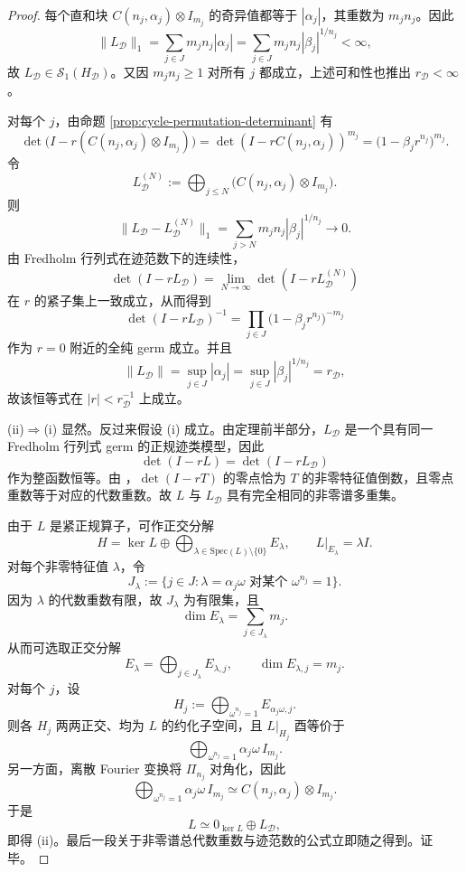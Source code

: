\begin{proof}
每个直和块 \(C(n_j,\alpha_j)\otimes I_{m_j}\) 的奇异值都等于 \(|\alpha_j|\)，其重数为 \(m_jn_j\)。因此
\[
\|L_{\mathcal D}\|_1
=\sum_{j\in J}m_jn_j|\alpha_j|
=\sum_{j\in J}m_jn_j|\beta_j|^{1/n_j}
<\infty,
\]
故 \(L_{\mathcal D}\in\mathcal{S}_1(H_{\mathcal D})\)。又因 \(m_jn_j\ge 1\) 对所有 \(j\) 都成立，上述可和性也推出 \(r_{\mathcal D}<\infty\)。

对每个 \(j\)，由命题 \ref{prop:cycle-permutation-determinant} 有
\[
\det\!\bigl(I-r(C(n_j,\alpha_j)\otimes I_{m_j})\bigr)
=\det(I-rC(n_j,\alpha_j))^{m_j}
=\bigl(1-\beta_j r^{n_j}\bigr)^{m_j}.
\]
令
\[
L_{\mathcal D}^{(N)}
:=\bigoplus_{j\le N}\bigl(C(n_j,\alpha_j)\otimes I_{m_j}\bigr).
\]
则
\[
\|L_{\mathcal D}-L_{\mathcal D}^{(N)}\|_1
=\sum_{j>N}m_jn_j|\beta_j|^{1/n_j}\to 0.
\]
由 Fredholm 行列式在迹范数下的连续性，
\[
\det(I-rL_{\mathcal D})
=\lim_{N\to\infty}\det(I-rL_{\mathcal D}^{(N)})
\]
在 \(r\) 的紧子集上一致成立，从而得到
\[
\det(I-rL_{\mathcal D})^{-1}
=\prod_{j\in J}\bigl(1-\beta_j r^{n_j}\bigr)^{-m_j}
\]
作为 \(r=0\) 附近的全纯 germ 成立。并且
\[
\|L_{\mathcal D}\|
=\sup_{j\in J}|\alpha_j|
=\sup_{j\in J}|\beta_j|^{1/n_j}
=r_{\mathcal D},
\]
故该恒等式在 \(|r|<r_{\mathcal D}^{-1}\) 上成立。

\textup{(ii)}\(\Rightarrow\)\textup{(i)} 显然。反过来假设 \textup{(i)} 成立。由定理前半部分，\(L_{\mathcal D}\) 是一个具有同一 Fredholm 行列式 germ 的正规迹类模型，因此
\[
\det(I-rL)=\det(I-rL_{\mathcal D})
\]
作为整函数恒等。由 \cite[Theorem~3.7]{Simon2005TraceIdeals}，\(\det(I-rT)\) 的零点恰为 \(T\) 的非零特征值倒数，且零点重数等于对应的代数重数。故 \(L\) 与 \(L_{\mathcal D}\) 具有完全相同的非零谱多重集。

由于 \(L\) 是紧正规算子，可作正交分解
\[
H=\ker L\oplus\bigoplus_{\lambda\in\mathrm{Spec}(L)\setminus\{0\}}E_\lambda,
\qquad
L|_{E_\lambda}=\lambda I.
\]
对每个非零特征值 \(\lambda\)，令
\[
J_\lambda
:=\bigl\{j\in J:\lambda=\alpha_j\omega
\text{ 对某个 }\omega^{n_j}=1\bigr\}.
\]
因为 \(\lambda\) 的代数重数有限，故 \(J_\lambda\) 为有限集，且
\[
\dim E_\lambda=\sum_{j\in J_\lambda}m_j.
\]
从而可选取正交分解
\[
E_\lambda=\bigoplus_{j\in J_\lambda}E_{\lambda,j},
\qquad
\dim E_{\lambda,j}=m_j.
\]
对每个 \(j\)，设
\[
H_j:=\bigoplus_{\omega^{n_j}=1}E_{\alpha_j\omega,j}.
\]
则各 \(H_j\) 两两正交、均为 \(L\) 的约化子空间，且 \(L|_{H_j}\) 酉等价于
\[
\bigoplus_{\omega^{n_j}=1}\alpha_j\omega\,I_{m_j}.
\]
另一方面，离散 Fourier 变换将 \(\Pi_{n_j}\) 对角化，因此
\[
\bigoplus_{\omega^{n_j}=1}\alpha_j\omega\,I_{m_j}
\simeq
C(n_j,\alpha_j)\otimes I_{m_j}.
\]
于是
\[
L\simeq 0_{\ker L}\oplus L_{\mathcal D},
\]
即得 \textup{(ii)}。最后一段关于非零谱总代数重数与迹范数的公式立即随之得到。证毕。
\end{proof}

\endinput
